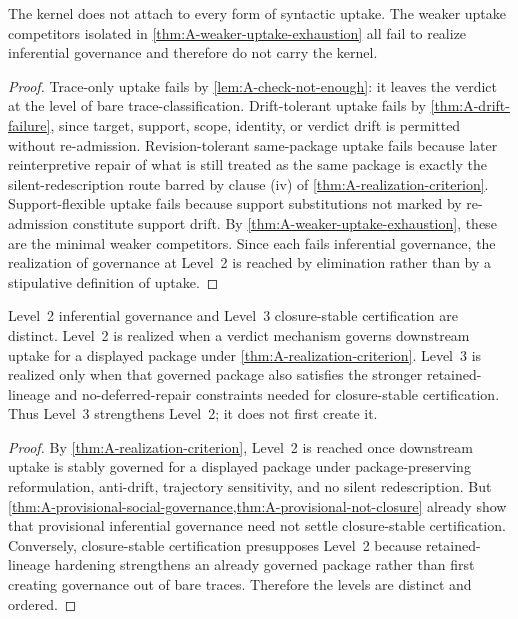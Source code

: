 \begin{theorem}
\label{thm:A-weaker-uptake-exclusion}
The kernel does not attach to every form of syntactic uptake. The weaker uptake competitors isolated in \cref{thm:A-weaker-uptake-exhaustion} all fail to realize inferential governance and therefore do not carry the kernel.
\end{theorem}

\begin{proof}
Trace-only uptake fails by \cref{lem:A-check-not-enough}: it leaves the verdict at the level of bare trace-classification. Drift-tolerant uptake fails by \cref{thm:A-drift-failure}, since target, support, scope, identity, or verdict drift is permitted without re-admission. Revision-tolerant same-package uptake fails because later reinterpretive repair of what is still treated as the same package is exactly the silent-redescription route barred by clause (iv) of \cref{thm:A-realization-criterion}. Support-flexible uptake fails because support substitutions not marked by re-admission constitute support drift. By \cref{thm:A-weaker-uptake-exhaustion}, these are the minimal weaker competitors. Since each fails inferential governance, the realization of governance at Level~2 is reached by elimination rather than by a stipulative definition of uptake.
\end{proof}

\begin{theorem}
\label{thm:A-level-separation}
Level~2 inferential governance and Level~3 closure-stable certification are distinct. Level~2 is realized when a verdict mechanism governs downstream uptake for a displayed package under \cref{thm:A-realization-criterion}. Level~3 is realized only when that governed package also satisfies the stronger retained-lineage and no-deferred-repair constraints needed for closure-stable certification. Thus Level~3 strengthens Level~2; it does not first create it.
\end{theorem}

\begin{proof}
By \cref{thm:A-realization-criterion}, Level~2 is reached once downstream uptake is stably governed for a displayed package under package-preserving reformulation, anti-drift, trajectory sensitivity, and no silent redescription. But \cref{thm:A-provisional-social-governance,thm:A-provisional-not-closure} already show that provisional inferential governance need not settle closure-stable certification. Conversely, closure-stable certification presupposes Level~2 because retained-lineage hardening strengthens an already governed package rather than first creating governance out of bare traces. Therefore the levels are distinct and ordered.
\end{proof}

